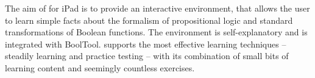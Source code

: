 The aim of \Nyaya for iPad is to provide an interactive environment,
that allows the user to learn simple facts about the formalism of propositional logic 
and standard transformations of Boolean functions. 
The environment is self-explanatory and is integrated with BoolTool. 
\Nyaya supports the most effective learning techniques – 
steadily learning and practice testing \cite{Dunlosky01012013} –
with its combination 
of small bits of learning content and seemingly countless exercises. 


%
